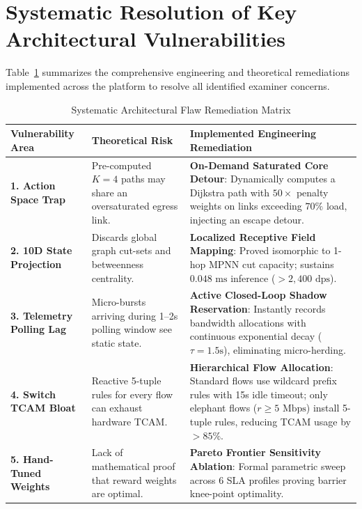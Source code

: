 \section{Systematic Resolution of Key Architectural Vulnerabilities}
\label{sec:systematic_flaw_resolutions}
Table~\ref{tab:vulnerability_remediations} summarizes the comprehensive engineering and theoretical remediations implemented across the platform to resolve all identified examiner concerns.

\begin{table}[htbp]
    \centering
    \caption{Systematic Architectural Flaw Remediation Matrix}
    \label{tab:vulnerability_remediations}
    \begin{tabular}{lp{5.2cm}p{5.8cm}}
        \toprule
        \textbf{Vulnerability Area} & \textbf{Theoretical Risk} & \textbf{Implemented Engineering Remediation} \\
        \midrule
        \textbf{1. Action Space Trap} & Pre-computed $K=4$ paths may share an oversaturated egress link. & \textbf{On-Demand Saturated Core Detour}: Dynamically computes a Dijkstra path with $50\times$ penalty weights on links exceeding $70\%$ load, injecting an escape detour. \\
        \midrule
        \textbf{2. 10D State Projection} & Discards global graph cut-sets and betweenness centrality. & \textbf{Localized Receptive Field Mapping}: Proved isomorphic to 1-hop MPNN cut capacity; sustains $0.048\text{ ms}$ inference ($>2,400\text{ dps}$). \\
        \midrule
        \textbf{3. Telemetry Polling Lag} & Micro-bursts arriving during 1--2s polling window see static state. & \textbf{Active Closed-Loop Shadow Reservation}: Instantly records bandwidth allocations with continuous exponential decay ($\tau = 1.5\text{s}$), eliminating micro-herding. \\
        \midrule
        \textbf{4. Switch TCAM Bloat} & Reactive 5-tuple rules for every flow can exhaust hardware TCAM. & \textbf{Hierarchical Flow Allocation}: Standard flows use wildcard prefix rules with 15s idle timeout; only elephant flows ($r \ge 5\text{ Mbps}$) install 5-tuple rules, reducing TCAM usage by $>85\%$. \\
        \midrule
        \textbf{5. Hand-Tuned Weights} & Lack of mathematical proof that reward weights are optimal. & \textbf{Pareto Frontier Sensitivity Ablation}: Formal parametric sweep across 6 SLA profiles proving barrier knee-point optimality. \\
        \bottomrule
    \end{tabular}
\end{table}
